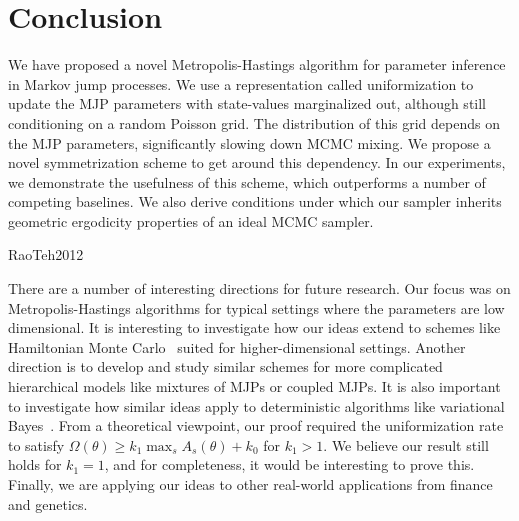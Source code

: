 \section{Conclusion}

We have proposed a novel Metropolis-Hastings algorithm for parameter 
inference in Markov jump processes. We use a representation called 
uniformization to update the MJP parameters with state-values marginalized 
out, although still conditioning on a random Poisson grid. The 
distribution of this grid depends on the MJP parameters, significantly 
slowing down MCMC mixing. We propose a novel symmetrization scheme to get 
around this dependency. In our experiments, we demonstrate the usefulness 
of this scheme, which outperforms a number of competing baselines.
We also derive conditions under which our sampler inherits geometric 
ergodicity properties of an ideal MCMC sampler.

RaoTeh2012

There are a number of interesting directions for future research.
Our focus was on Metropolis-Hastings algorithms for typical settings 
where the parameters are low dimensional. It is interesting to 
investigate how our ideas extend to schemes like Hamiltonian Monte 
Carlo~\cite{Neal2010} suited for higher-dimensional settings. Another 
direction is to develop and study similar schemes for more complicated 
hierarchical models like mixtures of MJPs or coupled MJPs. It is also 
important to investigate how similar ideas apply to deterministic 
algorithms like variational Bayes~\cite{panzanrao17}. From a theoretical 
viewpoint, our proof required the uniformization rate to satisfy 
$\Omega(\theta) \ge k_1 \max_s A_s(\theta) + k_0$ for $k_1 > 1$. We 
believe our result still holds for $k_1 = 1$, and for completeness, 
it would be interesting to prove this.  Finally, we are applying 
our ideas to other real-world applications from finance and genetics.
